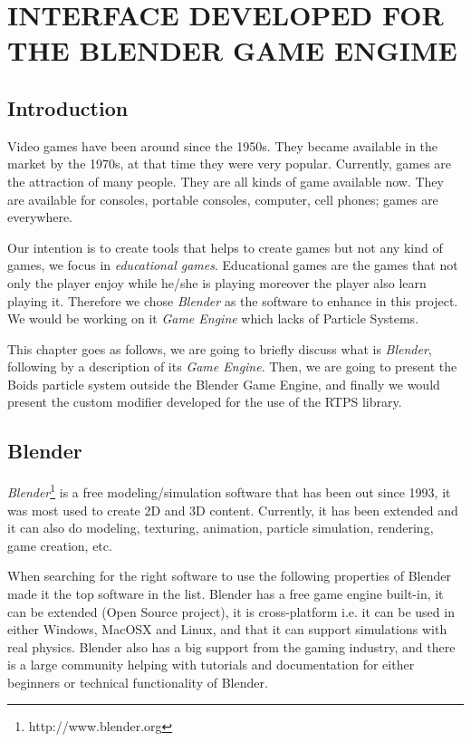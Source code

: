 \chapter{INTERFACE DEVELOPED FOR THE BLENDER GAME ENGIME}

\section{Introduction}

Video games have been around since the 1950s\cite{computerVideoGamesHistory}. They became available in the market by the 1970s, at that time they were very popular. Currently, games are the attraction of many people. They are all kinds of game available now. They are available for consoles, portable consoles, computer, cell phones; games are everywhere. 

Our intention is to create tools that helps to create games but not any kind of games, we focus in \textit{educational games}. Educational games are the games that not only the player enjoy while he/she is playing moreover the player also learn playing it. Therefore we chose \textit{Blender} as the software to enhance in this project. We would be working on it \textit{Game Engine} which lacks of Particle Systems.

This chapter goes as follows, we are going to briefly discuss what is \textit{Blender}, following by a description of its \textit{Game Engine}. Then, we are going to present the Boids particle system outside the Blender Game Engine, and finally we would present the custom modifier developed for the use of the RTPS library.

\section{Blender}\label{blenderSec}
\textit{Blender}\footnote{http://www.blender.org} is a free modeling/simulation software that has been out since 1993, it was most used to create 2D and 3D content. Currently, it has been extended and it can also do modeling, texturing, animation, particle simulation, rendering, game creation, etc.

When searching for the right software to use the following properties of Blender made it the top software in the list. Blender has a free game engine built-in, it can be extended (Open Source project), it is cross-platform i.e. it can be used in either Windows, MacOSX and Linux, and that it can support simulations with real physics. Blender also has a big support from the gaming industry, and there is a large community helping with tutorials and documentation for either beginners or technical functionality of Blender.

